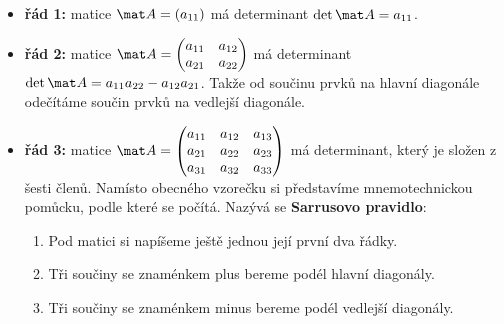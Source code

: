 \begin{itemize}
    \item \textbf{řád 1:} matice $\mat A = (a_{11})$ má determinant $\det \mat A = a_{11}$.
    \item \textbf{řád 2:} matice $\mat A = \begin{pmatrix}
        a_{11} & a_{12} \\ a_{21} & a_{22}
    \end{pmatrix}$ má determinant $\det \mat A = a_{11} a_{22} - a_{12} a_{21}$. Takže od součinu prvků na hlavní diagonále odečítáme součin prvků na vedlejší diagonále.
    \item \textbf{řád 3:} matice $\mat A = \begin{pmatrix}
        a_{11} & a_{12} & a_{13} \\ a_{21} & a_{22} & a_{23} \\ a_{31} & a_{32} & a_{33}
    \end{pmatrix}$ má determinant, který je složen z šesti členů. Namísto obecného vzorečku si představíme mnemotechnickou pomůcku, podle které se počítá. Nazývá se \textbf{Sarrusovo pravidlo}:
    \begin{enumerate}
        \item Pod matici si napíšeme ještě jednou její první dva řádky.
        \item Tři součiny se znaménkem plus bereme podél hlavní diagonály.
        \item Tři součiny se znaménkem minus bereme podél vedlejší diagonály. 
    \end{enumerate}


\end{itemize}
